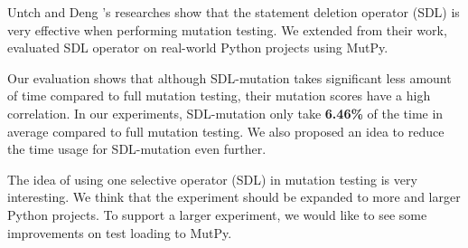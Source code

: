 \documentclass[12pt]{article}
\begin{document}
Untch \cite{untch2009reduced} and Deng \cite{deng2013empirical}'s researches show that the statement deletion operator (SDL) is very effective when performing mutation testing. We extended from their work, evaluated SDL operator on real-world Python projects using MutPy.

Our evaluation shows that although SDL-mutation takes significant less amount of time compared to full mutation testing, their mutation scores have a high correlation. In our experiments, SDL-mutation only take \textbf{6.46\%} of the time in average compared to full mutation testing. We also proposed an idea to reduce the time usage for SDL-mutation even further.

The idea of using one selective operator (SDL) in mutation testing is very interesting. We think that the experiment should be expanded to more and larger Python projects. To support a larger experiment, we would like to see some improvements on test loading to MutPy.



\end{document}
